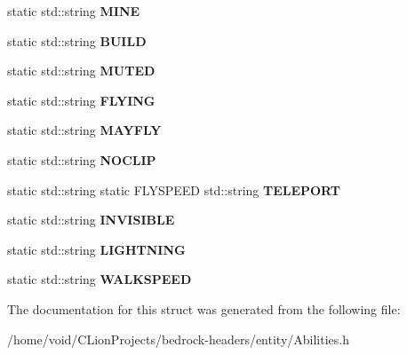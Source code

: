 \begin{DoxyCompactItemize}
static std\+::string {\bfseries M\+I\+NE}
\item 
\mbox{\label{struct_abilities_ad7af720059b5d6d7cf29de714819d2af}} 
static std\+::string {\bfseries B\+U\+I\+LD}
\item 
\mbox{\label{struct_abilities_a0e3a075b532204e7fc0cb368da8e1d6c}} 
static std\+::string {\bfseries M\+U\+T\+ED}
\item 
\mbox{\label{struct_abilities_a44a63ad3c5bc5f9091da2dc11a92810d}} 
static std\+::string {\bfseries F\+L\+Y\+I\+NG}
\item 
\mbox{\label{struct_abilities_a2b0f7b1eb593a5d2d9db0d8a04d3ce40}} 
static std\+::string {\bfseries M\+A\+Y\+F\+LY}
\item 
\mbox{\label{struct_abilities_a16368bca2391d9a29d7247ab0014bb44}} 
static std\+::string {\bfseries N\+O\+C\+L\+IP}
\item 
\mbox{\label{struct_abilities_ab9e5295e4a5127470b40b59cd20d86af}} 
static std\+::string static F\+L\+Y\+S\+P\+E\+ED std\+::string {\bfseries T\+E\+L\+E\+P\+O\+RT}
\item 
\mbox{\label{struct_abilities_ab8f0d959f3e4ad680b4e257067cb36e9}} 
static std\+::string {\bfseries I\+N\+V\+I\+S\+I\+B\+LE}
\item 
\mbox{\label{struct_abilities_a8b21d36a39e56b77ebe640fb7d80da0b}} 
static std\+::string {\bfseries L\+I\+G\+H\+T\+N\+I\+NG}
\item 
\mbox{\label{struct_abilities_af580dde153b2871743958e458936c8c1}} 
static std\+::string {\bfseries W\+A\+L\+K\+S\+P\+E\+ED}
\end{DoxyCompactItemize}


The documentation for this struct was generated from the following file\+:\begin{DoxyCompactItemize}
\item 
/home/void/\+C\+Lion\+Projects/bedrock-\/headers/entity/Abilities.\+h\end{DoxyCompactItemize}
